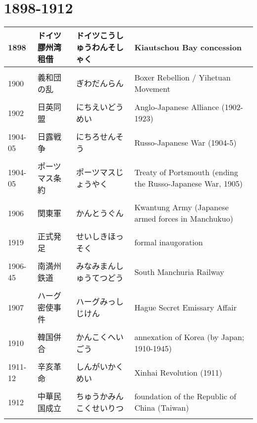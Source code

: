 \documentclass{article}
\begin{document}
\section{1898-1912}
\begin{tabular}{p{1.8cm} | p{3.4cm} | p{5.91cm} | p{7.0cm}}
1898 & ドイツ膠州湾租借 & ドイツこうしゅうわんそしゃく & Kiautschou Bay concession \\ \hline \\[-1em]
1900 & 義和団の乱 & ぎわだんらん & Boxer Rebellion / Yihetuan Movement​ \\ \hline \\[-1em]
1902 & 日英同盟 & にちえいどうめい & Anglo-Japanese Alliance (1902-1923)​ \\ \hline \\[-1em]
1904-05 & 日露戦争 & にちろせんそう & Russo-Japanese War (1904-5)​ \\ \hline \\[-1em]
1904-05 & ポーツマス条約 & ポーツマスじょうやく & Treaty of Portsmouth (ending the Russo-Japanese War, 1905)​ \\ \hline \\[-1em]
1906 & 関東軍 & かんとうぐん & Kwantung Army (Japanese armed forces in Manchukuo)​ \\ \hline \\[-1em]
1919 & 正式発足 & せいしきほっそく & formal inaugoration \\ \hline \\[-1em]
1906-45 & 南満州鉄道 & みなみまんしゅうてつどう & South Manchuria Railway \\ \hline \\[-1em]
1907 & ハーグ密使事件 & ハーグみっしじけん & Hague Secret Emissary Affair \\ \hline \\[-1em]
1910 & 韓国併合 & かんこくへいごう & annexation of Korea (by Japan; 1910-1945)​ \\ \hline \\[-1em]
1911-12 & 辛亥革命 & しんがいかくめい & Xinhai Revolution (1911)​ \\ \hline \\[-1em]
1912 & 中華民国成立 & ちゅうかみんこくせいりつ & foundation of the Republic of China (Taiwan) \\ \hline \\[-1em]
\end{tabular}
\end{document}
